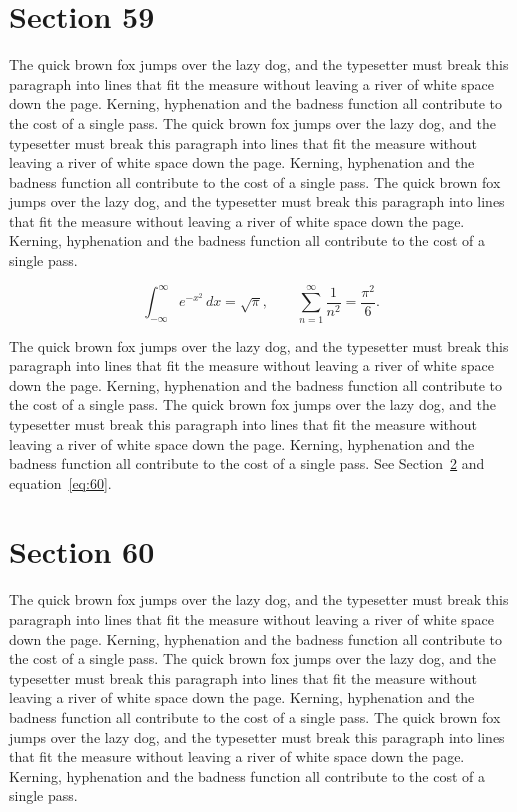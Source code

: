 \documentclass{article}
\begin{document}
\section{Section 59}
\label{sec:59}
The quick brown fox jumps over the lazy dog, and the typesetter must break this paragraph into lines that fit the measure without leaving a river of white space down the page. Kerning, hyphenation and the badness function all contribute to the cost of a single pass. The quick brown fox jumps over the lazy dog, and the typesetter must break this paragraph into lines that fit the measure without leaving a river of white space down the page. Kerning, hyphenation and the badness function all contribute to the cost of a single pass. The quick brown fox jumps over the lazy dog, and the typesetter must break this paragraph into lines that fit the measure without leaving a river of white space down the page. Kerning, hyphenation and the badness function all contribute to the cost of a single pass. 

\begin{equation}\label{eq:59}
\int_{-\infty}^{\infty} e^{-x^{2}}\,dx = \sqrt{\pi}, \qquad
\sum_{n=1}^{\infty} \frac{1}{n^{2}} = \frac{\pi^{2}}{6}.
\end{equation}

The quick brown fox jumps over the lazy dog, and the typesetter must break this paragraph into lines that fit the measure without leaving a river of white space down the page. Kerning, hyphenation and the badness function all contribute to the cost of a single pass. The quick brown fox jumps over the lazy dog, and the typesetter must break this paragraph into lines that fit the measure without leaving a river of white space down the page. Kerning, hyphenation and the badness function all contribute to the cost of a single pass. 
See Section~\ref{sec:60} and equation~\eqref{eq:60}.
\section{Section 60}
\label{sec:60}
The quick brown fox jumps over the lazy dog, and the typesetter must break this paragraph into lines that fit the measure without leaving a river of white space down the page. Kerning, hyphenation and the badness function all contribute to the cost of a single pass. The quick brown fox jumps over the lazy dog, and the typesetter must break this paragraph into lines that fit the measure without leaving a river of white space down the page. Kerning, hyphenation and the badness function all contribute to the cost of a single pass. The quick brown fox jumps over the lazy dog, and the typesetter must break this paragraph into lines that fit the measure without leaving a river of white space down the page. Kerning, hyphenation and the badness function all contribute to the cost of a single pass. 
\end{document}
